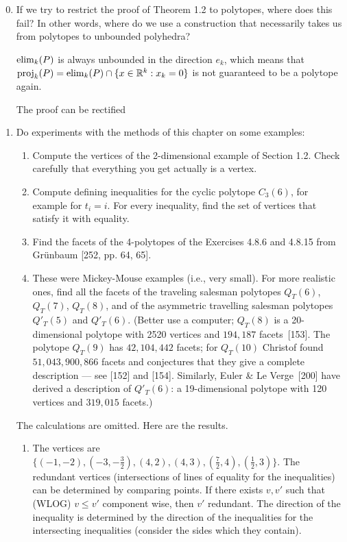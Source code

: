\documentclass{article}
\begin{document}
\begin{enumerate}
\setcounter{enumi}{-1}
\renewcommand{\labelenumi}{1.\arabic{enumi}}
\item If we try to restrict the proof of Theorem 1.2 to polytopes, where does this fail? In other words, where do we use a construction that necessarily takes us from polytopes to unbounded polyhedra?
\begin{solution}
    $\operatorname{elim}_k(P)$ is always unbounded in the direction $e_k$, which means that $\operatorname{proj}_k(P) = \operatorname{elim}_k(P) \cap \{x \in \mathbb{R}^k: x_k = 0\}$ is not guaranteed to be a polytope again.

\begin{remark}
    The proof can be rectified
\end{remark}
\end{solution}

\item Do experiments with the methods of this chapter on some examples:
\begin{enumerate}[label=(\roman*)]
\item Compute the vertices of the 2-dimensional example of Section 1.2. Check carefully that everything you get actually is a vertex.
  
\item Compute defining inequalities for the cyclic polytope $C_3(6)$, for example for $t_i = i$. For every inequality, find the set of vertices that satisfy it with equality.
  
\item Find the facets of the 4-polytopes of the Exercises 4.8.6 and 4.8.15 from Grünbaum [252, pp. 64, 65].
  
\item These were Mickey-Mouse examples (i.e., very small). For more realistic ones, find all the facets of the traveling salesman polytopes $Q_T(6)$, $Q_T(7)$, $Q_T(8)$, and of the asymmetric travelling salesman polytopes $Q'_T(5)$ and $Q'_T(6)$. (Better use a computer; $Q_T(8)$ is a 20-dimensional polytope with 2520 vertices and $194,187$ facets~[153]. The polytope $Q_T(9)$ has $42,104,442$ facets; for $Q_T(10)$ Christof found $51,043,900,866$ facets and conjectures that they give a complete description --- see [152] and [154]. Similarly, Euler \& Le Verge~[200] have derived a description of $Q'_T(6)$: a 19-dimensional polytope with 120 vertices and $319,015$ facets.)
\end{enumerate}

\begin{solution} The calculations are omitted. Here are the results.
\begin{enumerate}[label=(\roman*)]
    \item The vertices are $\{(-1, -2), (-3, -\frac{3}{2}), (4, 2), (4, 3), (\frac{7}{2}, 4), (\frac{1}{2}, 3)\}$. The redundant vertices (intersections of lines of equality for the inequalities) can be determined by comparing points. If there exists $v, v'$ such that (WLOG) $v \leq v'$ component wise, then $v'$ redundant. The direction of the inequality is determined by the direction of the inequalities for the intersecting inequalities (consider the sides which they contain).


\end{enumerate}
\end{solution}
\end{enumerate}
\end{document}
